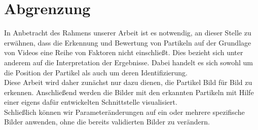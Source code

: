 \section{Abgrenzung \label{Einleitung:Abgrenzung}}
In Anbetracht des Rahmens unserer Arbeit ist es notwendig, an dieser Stelle zu erwähnen, dass die Erkennung und Bewertung von Partikeln auf der Grundlage von Videos eine Reihe von Faktoren nicht einschließt. Dies bezieht sich unter anderem auf die Interpretation der Ergebnisse. Dabei handelt es sich sowohl um die Position der Partikel als auch um deren Identifizierung.\\
Diese Arbeit wird daher zunächst nur dazu dienen, die Partikel Bild für Bild zu erkennen. Anschließend werden die Bilder mit den erkannten Partikeln mit Hilfe einer eigens dafür entwickelten Schnittstelle visualisiert.\\ Schließlich können wir Parameteränderungen auf ein oder mehrere spezifische Bilder anwenden, ohne die bereits validierten Bilder zu verändern.



